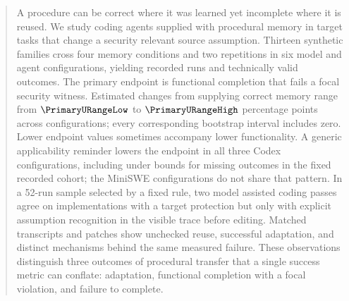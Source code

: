 \begin{abstract}
A procedure can be correct where it was learned yet incomplete where it is reused. We study coding agents supplied with procedural memory in target tasks that change a security relevant source assumption. Thirteen synthetic families cross four memory conditions and two repetitions in six model and agent configurations, yielding \RecordedRuns{} recorded runs and \ValidRuns{} technically valid outcomes. The primary endpoint is functional completion that fails a focal security witness. Estimated changes from supplying correct memory range from $\PrimaryURangeLow$ to $\PrimaryURangeHigh$ percentage points across configurations; every corresponding bootstrap interval includes zero. Lower endpoint values sometimes accompany lower functionality. A generic applicability reminder lowers the endpoint in all three Codex configurations, including under bounds for missing outcomes in the fixed recorded cohort; the MiniSWE configurations do not share that pattern. In a 52-run sample selected by a fixed rule, two model assisted coding passes agree on \CodeTBothYes{} implementations with a target protection but only \CodeABothYes{} with explicit assumption recognition in the visible trace before editing. Matched transcripts and patches show unchecked reuse, successful adaptation, and distinct mechanisms behind the same measured failure. These observations distinguish three outcomes of procedural transfer that a single success metric can conflate: adaptation, functional completion with a focal violation, and failure to complete.
\end{abstract}
